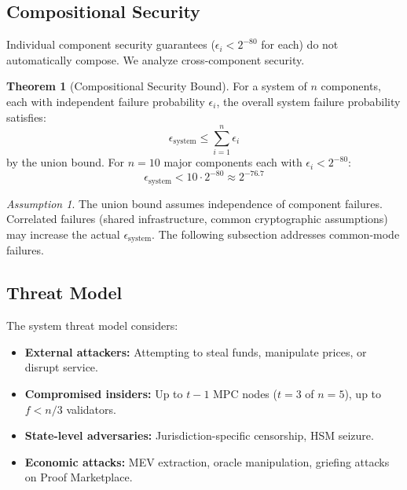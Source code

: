 \documentclass[12pt,a4paper]{article}
\theoremstyle{definition}
\newtheorem{theorem}{Theorem}[section]
\theoremstyle{remark}
\newtheorem{assumption}{Assumption}[section]
\begin{document}
\subsection{Compositional Security}

Individual component security guarantees ($\epsilon_i < 2^{-80}$ for each) do not automatically compose. We analyze cross-component security.

\begin{theorem}[Compositional Security Bound]
\label{thm:compositional}
For a system of $n$ components, each with independent failure probability $\epsilon_i$, the overall system failure probability satisfies:
\begin{equation}
\epsilon_{\text{system}} \leq \sum_{i=1}^{n} \epsilon_i
\end{equation}
by the union bound. For $n = 10$ major components each with $\epsilon_i < 2^{-80}$:
\begin{equation}
\epsilon_{\text{system}} < 10 \cdot 2^{-80} \approx 2^{-76.7}
\end{equation}
\end{theorem}

\begin{assumption}
\label{asm:compositional-independence}
The union bound assumes independence of component failures. Correlated failures (shared infrastructure, common cryptographic assumptions) may increase the actual $\epsilon_{\text{system}}$. The following subsection addresses common-mode failures.
\end{assumption}

\subsection{Threat Model}

The system threat model considers:
\begin{itemize}[nosep]
    \item \textbf{External attackers:} Attempting to steal funds, manipulate prices, or disrupt service.
    \item \textbf{Compromised insiders:} Up to $t-1$ MPC nodes ($t=3$ of $n=5$), up to $f < n/3$ validators.
    \item \textbf{State-level adversaries:} Jurisdiction-specific censorship, HSM seizure.
    \item \textbf{Economic attacks:} MEV extraction, oracle manipulation, griefing attacks on Proof Marketplace.
\end{itemize}
\end{document}
